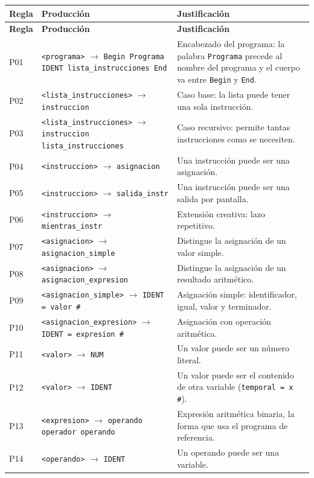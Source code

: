 \documentclass[11pt,letterpaper]{article}
\newcommand{\nt}[1]{\texttt{\textless #1\textgreater}}
\newcommand{\regla}[2]{\nt{#1} $\rightarrow$ \texttt{#2}}
\begin{document}
\begin{longtable}{|L{1.2cm}|L{\dimexpr\textwidth-1.2cm-5.0cm-6\arrayrulewidth\relax}|L{5.0cm}|}
\hline
{}\textbf{Regla} & \textbf{Producción} & \textbf{Justificación}\\\hline
\endfirsthead
\hline
{}\textbf{Regla} & \textbf{Producción} & \textbf{Justificación}\\\hline
\endhead

P01 & \regla{programa}{Begin Programa IDENT lista\_instrucciones End} &
Encabezado del programa: la palabra \texttt{Programa} precede al nombre del programa y el cuerpo
va entre \texttt{Begin} y \texttt{End}.\\\hline
P02 & \regla{lista\_instrucciones}{instruccion} &
Caso base: la lista puede tener una sola instrucción.\\\hline
P03 & \regla{lista\_instrucciones}{instruccion lista\_instrucciones} &
Caso recursivo: permite tantas instrucciones como se necesiten.\\\hline
P04 & \regla{instruccion}{asignacion} &
Una instrucción puede ser una asignación.\\\hline
P05 & \regla{instruccion}{salida\_instr} &
Una instrucción puede ser una salida por pantalla.\\\hline
P06 & \regla{instruccion}{mientras\_instr} &
Extensión creativa: lazo repetitivo.\\\hline
P07 & \regla{asignacion}{asignacion\_simple} &
Distingue la asignación de un valor simple.\\\hline
P08 & \regla{asignacion}{asignacion\_expresion} &
Distingue la asignación de un resultado aritmético.\\\hline
P09 & \regla{asignacion\_simple}{IDENT = valor \#} &
Asignación simple: identificador, igual, valor y terminador.\\\hline
P10 & \regla{asignacion\_expresion}{IDENT = expresion \#} &
Asignación con operación aritmética.\\\hline
P11 & \regla{valor}{NUM} &
Un valor puede ser un número literal.\\\hline
P12 & \regla{valor}{IDENT} &
Un valor puede ser el contenido de otra variable (\texttt{temporal = x \#}).\\\hline
P13 & \regla{expresion}{operando operador operando} &
Expresión aritmética binaria, la forma que usa el programa de referencia.\\\hline
P14 & \regla{operando}{IDENT} &
Un operando puede ser una variable.\\\hline

\end{longtable}
\end{document}
